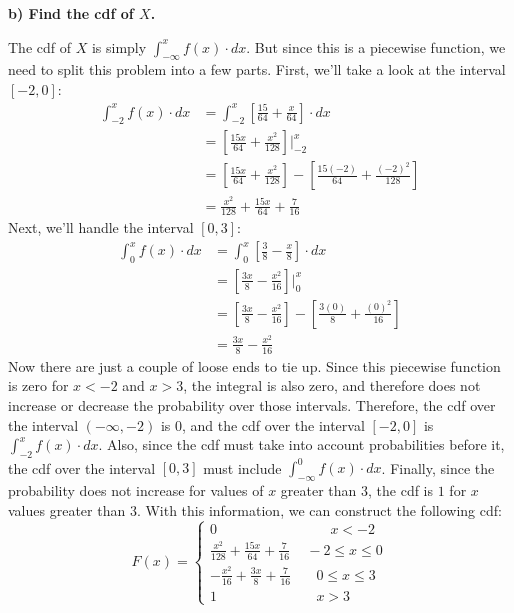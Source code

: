 \documentclass[12pt, letter]{article}
\begin{document}
\qquad \textbf{b) Find the cdf of $X$.}
\begin{center}
	The cdf of $X$ is simply $\int_{-\infty}^{x} f(x) \cdot dx$. But since this is a piecewise function, we need to split this problem into a few parts. First, we'll take a look at the interval $[-2, 0]$:
	\begin{align*}
		\int_{-2}^{x} f(x) \cdot dx &= \int_{-2}^{x} \left[\frac{15}{64} + \frac{x}{64}\right] \cdot dx \\
		&= \left[\frac{15x}{64} + \frac{x^{2}}{128}\right] \Bigg|_{-2}^{x} \\
		&= \left[\frac{15x}{64} + \frac{x^{2}}{128}\right] - \left[\frac{15(-2)}{64} + \frac{(-2)^{2}}{128}\right] \\
		&= \frac{x^{2}}{128} + \frac{15x}{64} + \frac{7}{16}
	\end{align*}
	Next, we'll handle the interval $[0, 3]$:
	\begin{align*}
		\int_{0}^{x} f(x) \cdot dx &= \int_{0}^{x} \left[\frac{3}{8} - \frac{x}{8}\right] \cdot dx \\
		&= \left[\frac{3x}{8} - \frac{x^{2}}{16}\right] \Bigg|_{0}^{x} \\
		&= \left[\frac{3x}{8} - \frac{x^{2}}{16}\right] - \left[\frac{3(0)}{8} + \frac{(0)^{2}}{16}\right] \\
		&= \frac{3x}{8} - \frac{x^{2}}{16}
	\end{align*}
	Now there are just a couple of loose ends to tie up. Since this piecewise function is zero for $x < -2$ and $x > 3$, the integral is also zero, and therefore does not increase or decrease the probability over those intervals. Therefore, the cdf over the interval $(-\infty, -2)$ is $0$, and the cdf over the interval $[-2, 0]$ is $\int_{-2}^{x} f(x) \cdot dx$. Also, since the cdf must take into account probabilities before it, the cdf over the interval $[0, 3]$ must include $\int_{-\infty}^{0} f(x) \cdot dx$. Finally, since the probability does not increase for values of $x$ greater than $3$, the cdf is $1$ for $x$ values greater than $3$. With this information, we can construct the following cdf:
	\[F(x) = \left\{
    		\begin{array}{cc}
    			0 & \qquad x < -2 \\
    			\frac{x^{2}}{128} + \frac{15x}{64} + \frac{7}{16} & \; -2 \le x \le 0\\
        		-\frac{x^{2}}{16} + \frac{3x}{8} + \frac{7}{16} & \quad 0 \le x \le 3 \\
        		1 & \quad x > 3
        	\end{array}
        \right.\]
\end{center}
\end{document}
